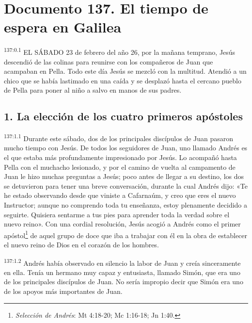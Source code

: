 \chapter{Documento 137. El tiempo de espera en Galilea}
\par
\textsuperscript{137:0.1} EL SÁBADO 23 de febrero del año 26, por la mañana temprano, Jesús descendió de las colinas para reunirse con los compañeros de Juan que acampaban en Pella. Todo este día Jesús se mezcló con la multitud. Atendió a un chico que se había lastimado en una caída y se desplazó hasta el cercano pueblo de Pella para poner al niño a salvo en manos de sus padres.

\section*{1. La elección de los cuatro primeros apóstoles}
\par
\textsuperscript{137:1.1} Durante este sábado, dos de los principales discípulos de Juan pasaron mucho tiempo con Jesús. De todos los seguidores de Juan, uno llamado Andrés es el que estaba más profundamente impresionado por Jesús. Lo acompañó hasta Pella con el muchacho lesionado, y por el camino de vuelta al campamento de Juan le hizo muchas preguntas a Jesús; poco antes de llegar a su destino, los dos se detuvieron para tener una breve conversación, durante la cual Andrés dijo: «Te he estado observando desde que viniste a Cafarnaúm, y creo que eres el nuevo Instructor; aunque no comprendo toda tu enseñanza, estoy plenamente decidido a seguirte. Quisiera sentarme a tus pies para aprender toda la verdad sobre el nuevo reino». Con una cordial resolución, Jesús acogió a Andrés como el primer apóstol\footnote{\textit{Selección de Andrés}: Mt 4:18-20; Mc 1:16-18; Jn 1:40.} de aquel grupo de doce que iba a trabajar con él en la obra de establecer el nuevo reino de Dios en el corazón de los hombres.

\par
\textsuperscript{137:1.2} Andrés había observado en silencio la labor de Juan y creía sinceramente en ella. Tenía un hermano muy capaz y entusiasta, llamado Simón, que era uno de los principales discípulos de Juan. No sería impropio decir que Simón era uno de los apoyos más importantes de Juan.

